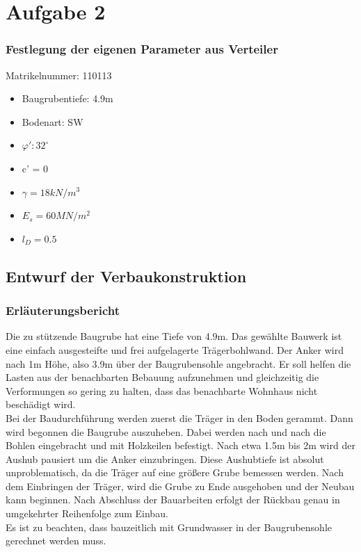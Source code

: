 \documentclass[11pt,fleqn,a4paper,halfparskip]{article}
\begin{document}
\newpage
\pagestyle{empty}




\pagestyle{plain}
\newpage
\section{Aufgabe 2}
\subsubsection*{Festlegung der eigenen Parameter aus Verteiler}
Matrikelnummer: 110113\\
\begin{itemize}
\item Baugrubentiefe: 4.9m
\item Bodenart: SW
\item $\varphi': 32^\circ$
\item c' = 0
\item $\gamma = 18kN/m^3$
\item $E_s = 60MN/m^2$
\item $l_D = 0.5$
\end{itemize}
\subsection{Entwurf der Verbaukonstruktion}
\subsubsection{Erläuterungsbericht}
Die zu stützende Baugrube hat eine Tiefe von 4.9m. Das gewählte Bauwerk ist eine einfach ausgesteifte und frei aufgelagerte Trägerbohlwand. Der Anker wird nach 1m Höhe, also 3.9m über der Baugrubensohle angebracht. Er soll helfen die Lasten aus der benachbarten Bebauung aufzunehmen und gleichzeitig die Verformungen so gering zu halten, dass das benachbarte Wohnhaus nicht beschädigt wird. \\
Bei der Baudurchführung werden zuerst die Träger in den Boden gerammt. Dann wird begonnen die Baugrube auszuheben. Dabei werden nach und nach die Bohlen eingebracht und mit Holzkeilen befestigt. Nach etwa 1.5m bis 2m wird der Aushub pausiert um die Anker einzubringen. Diese Aushubtiefe ist absolut unproblematisch, da die Träger auf eine größere Grube bemessen werden. Nach dem Einbringen der Träger, wird die Grube zu Ende ausgehoben und der Neubau kann beginnen. Nach Abschluss der Bauarbeiten erfolgt der Rückbau genau in umgekehrter Reihenfolge zum Einbau.\\
Es ist zu beachten, dass bauzeitlich mit Grundwasser in der Baugrubensohle gerechnet werden muss.
\end{document}
